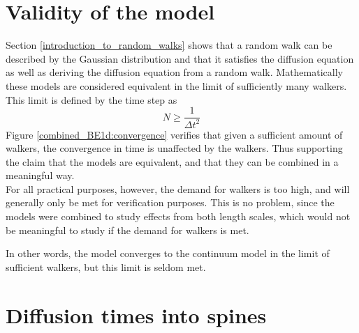 \documentclass[main.tex]{subfiles}
\begin{document}
 

\section{Validity of the model}

Section \ref{introduction_to_random_walks} shows that a random walk can be described by the Gaussian distribution and that it satisfies the diffusion equation as well as deriving the diffusion equation from a random walk. 
Mathematically these models are considered equivalent in the limit of sufficiently many walkers. 
This limit is defined by the time step as 
\begin{equation}
 N \geq \frac{1}{\Delta t^2}
\end{equation}
Figure \ref{combined_BE1d:convergence} verifies that given a sufficient amount of walkers, the convergence in time is unaffected by the walkers. 
Thus supporting the claim that the models are equivalent, and that they can be combined in a meaningful way. \\

For all practical purposes, however, the demand for walkers is too high, and will generally only be met for verification purposes. 
This is no problem, since the models were combined to study effects from both length scales, which would not be meaningful to study if the demand for walkers is met. 

In other words, the model converges to the continuum model in the limit of sufficient walkers, but this limit is seldom met.


\section{Diffusion times into spines}
\end{document}
